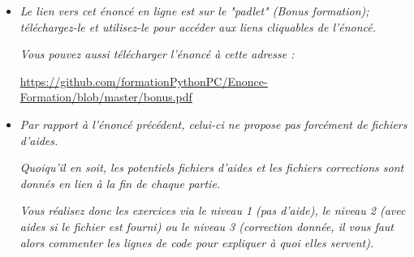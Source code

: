 \documentclass[11pt]{article}
\begin{document}
\begin{itemize}

\item \textit{Le lien vers cet énoncé en ligne est sur le "padlet" (Bonus formation); téléchargez-le et utilisez-le pour accéder aux liens cliquables de l'énoncé.}


\medskip

\textit{Vous pouvez aussi télécharger l'énoncé à cette adresse : }


\begin{center}
\underline{\url{https://github.com/formationPythonPC/Enonce-Formation/blob/master/bonus.pdf}                                                                                               }
\end{center}







\bigskip










\item \textit{Par rapport à l'énoncé précédent, celui-ci ne propose pas forcément  de fichiers d'aides.}

\medskip

\textit{Quoiqu'il en soit, les potentiels fichiers d'aides et les fichiers corrections sont donnés en lien à la fin de chaque partie.}

\medskip
\textit{Vous réalisez donc les exercices via le niveau 1 (pas d'aide), le niveau 2 (avec aides si le fichier est fourni) ou le niveau 3 (correction donnée, il vous faut alors commenter les lignes de code pour expliquer à quoi elles servent).} 








\bigskip














\end{itemize}
\end{document}
